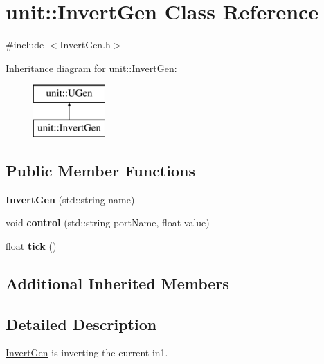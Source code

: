 \hypertarget{classunit_1_1InvertGen}{\section{unit\-:\-:Invert\-Gen Class Reference}
\label{classunit_1_1InvertGen}
}


{\ttfamily \#include $<$Invert\-Gen.\-h$>$}

Inheritance diagram for unit\-:\-:Invert\-Gen\-:\begin{figure}[H]
\begin{center}
\leavevmode
\includegraphics[height=2.000000cm]{classunit_1_1InvertGen}
\end{center}
\end{figure}
\subsection*{Public Member Functions}
\begin{DoxyCompactItemize}
\item 
\hypertarget{classunit_1_1InvertGen_a6df9413e609ffe377f728d38c9107f97}{{\bfseries Invert\-Gen} (std\-::string name)}\label{classunit_1_1InvertGen_a6df9413e609ffe377f728d38c9107f97}

\item 
\hypertarget{classunit_1_1InvertGen_a7f239d73ca02d40f4e2cda336887a852}{void {\bfseries control} (std\-::string port\-Name, float value)}\label{classunit_1_1InvertGen_a7f239d73ca02d40f4e2cda336887a852}

\item 
\hypertarget{classunit_1_1InvertGen_aacbd94fb460ccf492408d987a609cc8c}{float {\bfseries tick} ()}\label{classunit_1_1InvertGen_aacbd94fb460ccf492408d987a609cc8c}

\end{DoxyCompactItemize}
\subsection*{Additional Inherited Members}


\subsection{Detailed Description}
\hyperlink{classunit_1_1InvertGen}{Invert\-Gen} is inverting the current in1.

